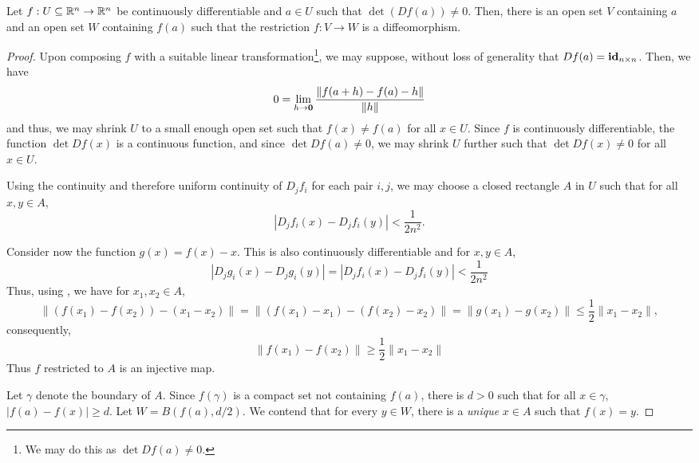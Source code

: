 \begin{theorem}
    Let $f:U\subseteq\mathbb{R}^n\to\mathbb{R}^n$ be continuously differentiable and $a\in U$ such that $\det(Df(a))\ne 0$. Then, there is an open set $V$ containing $a$ and an open set $W$ containing $f(a)$ such that the restriction $f: V\to W$ is a diffeomorphism.
\end{theorem}
\begin{proof}
    Upon composing $f$ with a suitable linear transformation\footnote{We may do this as $\det Df(a)\ne 0$.}, we may suppose, without loss of generality that $Df(a) = \mathbf{id}_{n\times n}$. Then, we have 
    \begin{equation*}
        0 = \lim_{h\to\mathbf{0}}\frac{\|f(a + h) - f(a) - h\|}{\|h\|}
    \end{equation*}
    and thus, we may shrink $U$ to a small enough open set such that $f(x)\ne f(a)$ for all $x\in U$. Since $f$ is continuously differentiable, the function $\det Df(x)$ is a continuous function, and since $\det Df(a)\ne 0$, we may shrink $U$ further such that $\det Df(x)\ne 0$ for all $x\in U$.

    Using the continuity and therefore uniform continuity of $D_jf_i$ for each pair $i,j$, we may choose a closed rectangle $A$ in $U$ such that for all $x,y\in A$, 
    \begin{equation*}
        |D_jf_i(x) - D_jf_i(y)| < \frac{1}{2n^2}.
    \end{equation*}

    Consider now the function $g(x) = f(x) - x$. This is also continuously differentiable and for $x,y\in A$,
    \begin{equation*}
        |D_jg_i(x) - D_jg_i(y)| = |D_jf_i(x) - D_jf_i(y)| < \frac{1}{2n^2}
    \end{equation*}
    Thus, using , we have for $x_1,x_2\in A$,
    \begin{equation*}
        \|(f(x_1) - f(x_2)) - (x_1 - x_2)\| = \|(f(x_1) - x_1) - (f(x_2) - x_2)\| = \|g(x_1) - g(x_2)\|\le\frac{1}{2}\|x_1 - x_2\|,
    \end{equation*}
    consequently,
    \begin{equation*}
        \|f(x_1) - f(x_2)\|\ge\frac{1}{2}\|x_1 - x_2\|
    \end{equation*}
    Thus $f$ restricted to $A$ is an injective map.

    Let $\gamma$ denote the boundary of $A$. Since $f(\gamma)$ is a compact set not containing $f(a)$, there is $d > 0$ such that for all $x\in\gamma$, $|f(a) - f(x)|\ge d$. Let $W = B(f(a), d/2)$. We contend that for every $y\in W$, there is a \emph{unique} $x\in A$ such that $f(x) = y$.


\end{proof}
